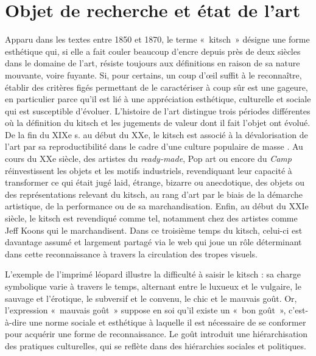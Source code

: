 \documentclass[final, fra]{anthology-ch}     %
\begin{document}
\section{Objet de recherche et état de l’art}
Apparu dans les textes entre 1850 et 1870, le terme «~kitsch~» désigne  une forme esthétique qui, si elle a fait couler beaucoup d’encre depuis près de deux siècles dans le domaine de l’art, résiste toujours aux définitions en raison de sa nature mouvante, voire fuyante. Si, pour certains\cite{JOHANSSONkitschounaufrage2025a}, un coup d’œil suffit à le reconnaître, établir des critères figés permettant de le caractériser à coup sûr est une gageure, en particulier parce qu’il est lié à une appréciation esthétique, culturelle et sociale qui est susceptible d’évoluer. L’histoire de l’art distingue trois périodes différentes où la définition du kitsch et les jugements de valeur dont il fait l’objet ont évolué. De la fin du XIXe s. au début du XXe, le kitsch est associé à la dévalorisation de l’art par sa reproductibilité dans le cadre d’une culture populaire de masse \cite{OLALQUIAGARoyaumelartificelemergence2008}. Au cours du XXe siècle, des artistes du \textit{ready-made}, Pop art ou encore du \textit{Camp} réinvestissent les objets et les motifs industriels, revendiquant leur capacité à transformer ce qui était jugé laid, étrange, bizarre ou anecdotique, des objets ou des représentations relevant du kitsch, au rang d’art par le biais de la démarche artistique, de la performance ou de sa marchandisation. Enfin, au début du XXIe siècle, le kitsch est revendiqué comme tel, notamment chez des artistes comme Jeff Koons qui le marchandisent. Dans ce troisième temps du kitsch, celui-ci est davantage assumé \cite{PIATEKKitschVisualArts2024} et largement partagé via le web qui joue un rôle déterminant dans cette reconnaissance à travers la circulation des tropes visuels. 

L’exemple de l’imprimé léopard illustre la difficulté à saisir le kitsch \cite{buffard-moret_motif_2022} : sa charge symbolique varie à travers le temps, alternant entre le luxueux et le vulgaire, le sauvage et l’érotique, le subversif et le convenu, le chic et le mauvais goût. Or, l’expression «~mauvais goût~» suppose en soi qu’il existe un «~bon goût~», c’est-à-dire une norme sociale et esthétique à laquelle il est nécessaire de se conformer pour acquérir une forme de reconnaissance. Le goût introduit une hiérarchisation des pratiques culturelles, qui se reflète dans des hiérarchies sociales et politiques.
\end{document}
